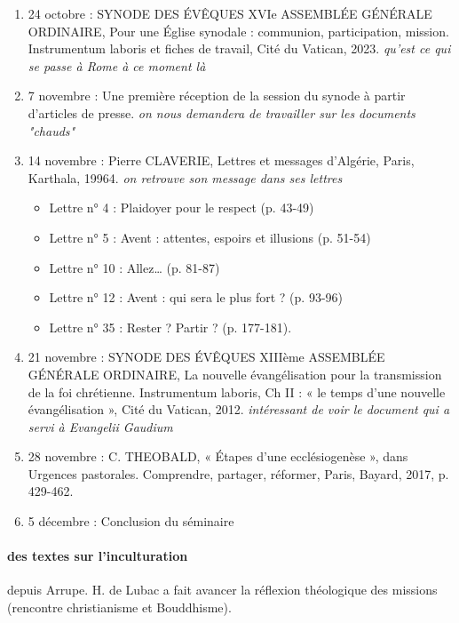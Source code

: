 \begin{enumerate}
    \item 	24 octobre : SYNODE DES ÉVÊQUES XVIe ASSEMBLÉE GÉNÉRALE ORDINAIRE, Pour une Église synodale : communion, participation, mission. Instrumentum laboris et fiches de travail, Cité du Vatican, 2023. \textit{qu'est ce qui se passe à Rome à ce moment là} 

    \item 	7 novembre : Une première réception de la session du synode à partir d’articles de presse. \textit{on nous demandera de travailler sur les documents "chauds"} 

    \item 	14 novembre : Pierre CLAVERIE, Lettres et messages d’Algérie, Paris, Karthala, 19964. \textit{on retrouve son message dans ses lettres}
\begin{itemize}
    \item Lettre n° 4 : Plaidoyer pour le respect (p. 43-49)
    \item Lettre n° 5 : Avent : attentes, espoirs et illusions (p. 51-54)
    \item Lettre n° 10 : Allez… (p. 81-87)
    \item Lettre n° 12 : Avent : qui sera le plus fort ? (p. 93-96)
    \item Lettre n° 35 : Rester ? Partir ? (p. 177-181).

\end{itemize}

    \item 	21 novembre : SYNODE DES ÉVÊQUES XIIIème ASSEMBLÉE GÉNÉRALE ORDINAIRE, La nouvelle évangélisation pour la transmission de la foi chrétienne. Instrumentum laboris, Ch II : « le temps d’une nouvelle évangélisation », Cité du Vatican, 2012. \textit{intéressant de voir le document qui a servi à Evangelii Gaudium }

    \item 	28 novembre : C. THEOBALD, « Étapes d’une ecclésiogenèse », dans Urgences pastorales. Comprendre, partager, réformer, Paris, Bayard, 2017, p. 429-462. 

    \item 5 décembre : Conclusion du séminaire

\end{enumerate}

\paragraph{des textes sur l'inculturation} depuis Arrupe. H. de Lubac a fait avancer la réflexion théologique des missions (rencontre christianisme et Bouddhisme). 

